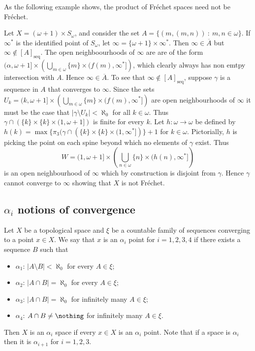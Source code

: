 \documentclass{article}
\newcommand{\seqcl}[1]{{[#1]_{\text{seq}}}}
\begin{document}
As the following example shows, the product of Fréchet spaces need not be Fréchet.
\begin{exam}
    Let \(X = (\omega + 1) \times S_\omega\), and consider the set \(A = \{(m, (m, n))\: : \:  m, n \in \omega\}\). If \(\infty^{\ast}\) is the identified point of \(S_{\omega}\), let \(\infty = \{\omega + 1\} \times \infty^{\ast}\). Then \(\infty \in \overline{A}\) but \(\infty \not \in \seqcl{A}\). The open neighboourhoods of \(\infty\) are are of the form \((\alpha, \omega + 1] \times\left(\bigcup_{m \in \omega}\{m\} \times (f(m), \infty^{\ast}]\right)\), which clearly always has non emtpy intersection with \(A\). Hence \(\infty \in \overline{A}\). To see that \(\infty \not \in \seqcl{A}\), suppose \(\gamma\) is a sequence in \(A\) that converges to \(\infty\). Since the sets \(U_k = (k, \omega + 1] \times\left(\bigcup_{m \in \omega}\{m\} \times (f(m), \infty^{\ast}]\right)\) are open neighbourhoods of \(\infty\) it must be the case that \(|\gamma \setminus U_k | < \aleph_0\) for all \(k \in \omega\). Thus  \(\gamma\cap\left(\{k\}\times\{k\}\times(1,\omega + 1]\right)\) is finite for every \(k\). Let \(h:\omega \to \omega\) be defined by \(h(k) = \max\{\pi_3(\gamma\cap\left(\{k\}\times\{k\}\times(1,\infty^{\ast}]\right)\} + 1\) for \(k \in \omega\). Pictorially, \(h\) is picking the point on each spine beyond which no elements of \(\gamma\) exist. Thus 
    \[
    W = (1, \omega + 1] \times\left(\bigcup_{n \in \omega}\{n\}\times(h(n), \infty^{\ast}]\right)
    \] 
    is an open neighbourhood of \(\infty\) which by construction is disjoint from \(\gamma\). Hence \(\gamma\) cannot converge to \(\infty\) showing that \(X\) is not Fréchet.
\end{exam}

\subsection{\(\alpha_i\) notions of convergence}

\begin{defn}
    Let \(X\) be a topological space and \(\xi\) be a countable family of sequences converging to a point \(x \in X\). We say that \(x\) is an \(\alpha_i\) point for \(i = 1, 2, 3, 4\) if there exists a sequence \(B\) such that 
    \begin{itemize}
        \item \(\alpha_1\):  \(|A \setminus B| < \aleph_0\) for every \(A \in \xi\);
        \item \(\alpha_2\): \(|A \cap B| = \aleph_0\) for every \(A \in \xi\);
        \item \(\alpha_3\): \(|A \cap B| = \aleph_0\) for infinitely many \(A \in \xi\);
        \item \(\alpha_4\): \(A \cap B \neq \nothing\) for infinitely many \(A \in \xi\).
    \end{itemize}
    Then \(X\) is an \(\alpha_i\) space if every \(x \in X\) is an \(\alpha_i\) point. Note that if a space is \(\alpha_i\) then it is \(\alpha_{i + 1}\) for \(i =1, 2, 3\).
\end{defn}
\end{document}

